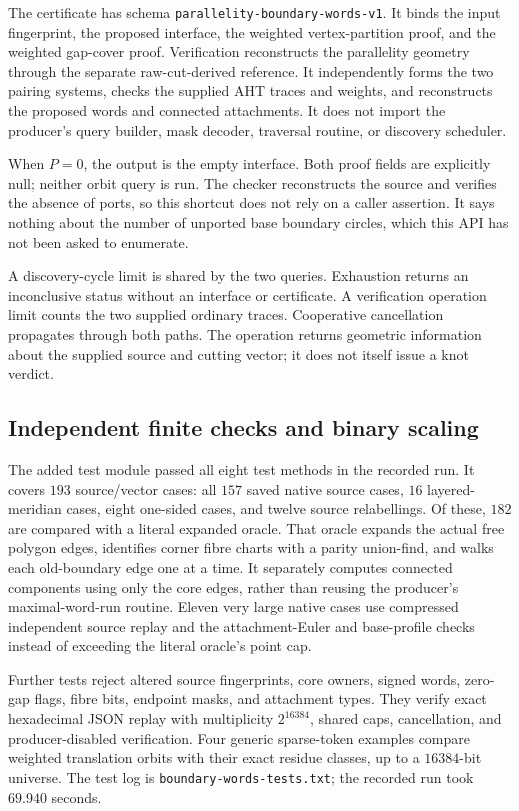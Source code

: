 The certificate has schema
\texttt{parallelity-boundary-words-v1}.  It binds the input fingerprint,
the proposed interface, the weighted vertex-partition proof, and the
weighted gap-cover proof.  Verification reconstructs the parallelity
geometry through the separate raw-cut-derived reference.  It independently
forms the two pairing systems, checks the supplied AHT traces and weights,
and reconstructs the proposed words and connected attachments.  It does not
import the producer's query builder, mask decoder, traversal routine, or
discovery scheduler.

When $P=0$, the output is the empty interface.  Both proof fields are
explicitly null; neither orbit query is run.  The checker reconstructs the
source and verifies the absence of ports, so this shortcut does not rely
on a caller assertion.  It says nothing about the number of unported base
boundary circles, which this API has not been asked to enumerate.

A discovery-cycle limit is shared by the two queries.  Exhaustion returns
an inconclusive status without an interface or certificate.  A verification
operation limit counts the two supplied ordinary traces.  Cooperative
cancellation propagates through both paths.  The operation returns geometric
information about the supplied source and cutting vector; it does not
itself issue a knot verdict.

\subsection{Independent finite checks and binary scaling}
\label{int:evidence}

The added test module passed all eight test methods in the recorded run.
It covers $193$ source/vector cases: all $157$ saved native source cases,
$16$ layered-meridian cases, eight one-sided cases, and twelve source
relabellings.  Of these, $182$ are compared with a literal expanded oracle.
That oracle expands the actual free polygon edges, identifies corner fibre
charts with a parity union-find, and walks each old-boundary edge one at a
time.  It separately computes connected components using only the core
edges, rather than reusing the producer's maximal-word-run routine.  Eleven
very large native cases use compressed independent source replay and the
attachment-Euler and base-profile checks instead of exceeding the literal
oracle's point cap.

Further tests reject altered source fingerprints, core owners, signed
words, zero-gap flags, fibre bits, endpoint masks, and attachment types.
They verify exact hexadecimal JSON replay with multiplicity $2^{16384}$,
shared caps, cancellation, and producer-disabled verification.  Four
generic sparse-token examples compare weighted translation orbits with
their exact residue classes, up to a $16384$-bit universe.  The test log is
\texttt{boundary-words-tests.txt}; the recorded run took $69.940$ seconds.

